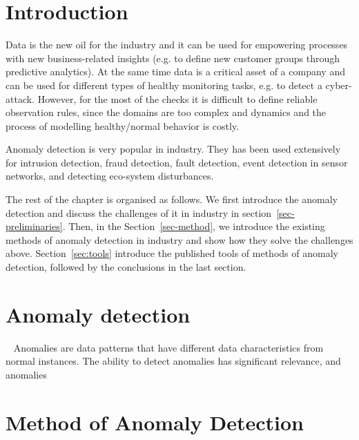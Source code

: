 \section{Introduction}\label{sec-intro}

Data is the new oil for the industry and
it can be used for empowering processes with
new business-related insights
(e.g. to define new customer groups through predictive analytics).
At the same time data is a critical asset of a company and
can be used for different types of healthy monitoring tasks,
e.g.
to detect a cyber-attack.
However,
for the most of the checks it is difficult
to define reliable observation rules,
since the domains are too complex and dynamics and
the process of modelling healthy/normal behavior is costly.

Anomaly detection is very popular in industry.
They has been used extensively for
intrusion detection,
fraud detection,
fault detection,
event detection in sensor networks,
and detecting eco-system disturbances.

The rest of the chapter is organised as follows.
We first introduce the anomaly detection and
discuss the challenges of it in industry in section~\ref{sec-preliminaries}.
Then,
in the Section~\ref{sec-method},
we introduce the existing methods of anomaly detection in
industry and show how they solve the challenges above.
Section~\ref{sec:tools} introduce the published tools of
methods of anomaly detection,
followed by the conclusions in the last section.

\section{Anomaly detection}~\label{sec-preliminaries}
Anomalies are data patterns that
have different data characteristics from normal
instances.
The ability to detect anomalies has significant relevance,
and anomalies



\section{Method of Anomaly Detection}~\label{sec-method}
